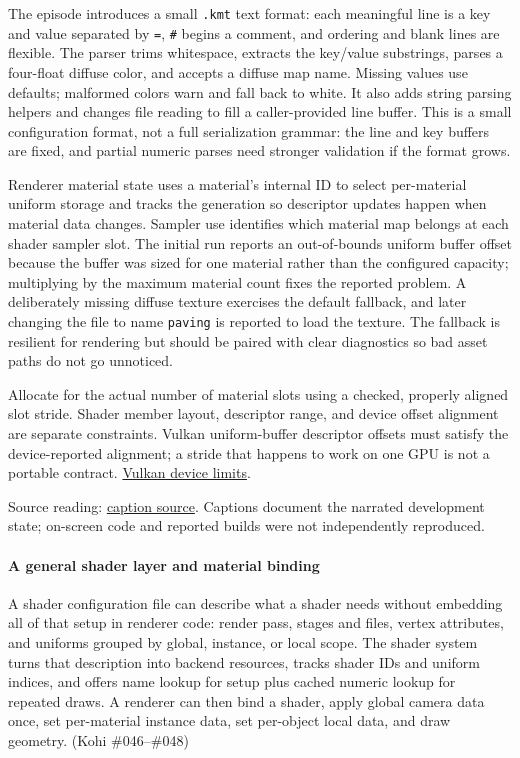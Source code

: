 The episode introduces a small \texttt{.kmt} text format: each meaningful line is a key and value separated by \texttt{=}, \texttt{\#} begins a comment, and ordering and blank lines are flexible. The parser trims whitespace, extracts the key/value substrings, parses a four-float diffuse color, and accepts a diffuse map name. Missing values use defaults; malformed colors warn and fall back to white. It also adds string parsing helpers and changes file reading to fill a caller-provided line buffer. This is a small configuration format, not a full serialization grammar: the line and key buffers are fixed, and partial numeric parses need stronger validation if the format grows.

Renderer material state uses a material's internal ID to select per-material uniform storage and tracks the generation so descriptor updates happen when material data changes. Sampler use identifies which material map belongs at each shader sampler slot. The initial run reports an out-of-bounds uniform buffer offset because the buffer was sized for one material rather than the configured capacity; multiplying by the maximum material count fixes the reported problem. A deliberately missing diffuse texture exercises the default fallback, and later changing the file to name \texttt{paving} is reported to load the texture. The fallback is resilient for rendering but should be paired with clear diagnostics so bad asset paths do not go unnoticed.

Allocate for the actual number of material slots using a checked, properly aligned slot stride. Shader member layout, descriptor range, and device offset alignment are separate constraints. Vulkan uniform-buffer descriptor offsets must satisfy the device-reported alignment; a stride that happens to work on one GPU is not a portable contract. \href{https://docs.vulkan.org/refpages/latest/refpages/source/VkPhysicalDeviceLimits.html}{Vulkan device limits}.

Source reading: \href{https://www.youtube.com/watch?v=K_jD7--h7F8}{caption source}. Captions document the narrated development state; on-screen code and reported builds were not independently reproduced.

\paragraph{A general shader layer and material binding}\label{a-general-shader-layer-and-material-binding}

A shader configuration file can describe what a shader needs without embedding all of that setup in renderer code: render pass, stages and files, vertex attributes, and uniforms grouped by global, instance, or local scope. The shader system turns that description into backend resources, tracks shader IDs and uniform indices, and offers name lookup for setup plus cached numeric lookup for repeated draws. A renderer can then bind a shader, apply global camera data once, set per-material instance data, set per-object local data, and draw geometry. (Kohi \#046--\#048)

